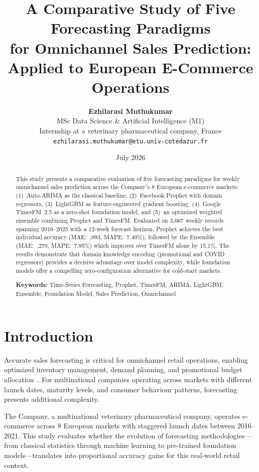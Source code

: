 \documentclass[10pt,twocolumn,a4paper]{article}
\title{\vspace{-1.5cm}\textbf{A Comparative Study of Five Forecasting Paradigms\\for Omnichannel Sales Prediction:\\Applied to European E-Commerce Operations}\vspace{-0.3cm}}
\author{
    \textbf{Ezhilarasi Muthukumar}\\
    \small MSc Data Science \& Artificial Intelligence (M1)\\
    \small Internship at a veterinary pharmaceutical company, France\\
    \small \texttt{ezhilarasi.muthukumar@etu.univ-cotedazur.fr}
}
\date{\small July 2026}
\begin{document}
\maketitle
\thispagestyle{fancy}

\begin{abstract}
\noindent This study presents a comparative evaluation of five forecasting paradigms for weekly omnichannel sales prediction across the Company's 8 European e-commerce markets: (1)~Auto-ARIMA as the classical baseline, (2)~Facebook Prophet with domain regressors, (3)~LightGBM as feature-engineered gradient boosting, (4)~Google TimesFM~2.5 as a zero-shot foundation model, and (5)~an optimized weighted ensemble combining Prophet and TimesFM. Evaluated on 3,067 weekly records spanning 2016--2025 with a 12-week forecast horizon, Prophet achieves the best individual accuracy (MAE:~,093, MAPE:~7.40\%), followed by the Ensemble (MAE:~,270, MAPE:~7.95\%) which improves over TimesFM alone by 15.1\%. The results demonstrate that domain knowledge encoding (promotional and COVID regressors) provides a decisive advantage over model complexity, while foundation models offer a compelling zero-configuration alternative for cold-start markets.

\medskip
\noindent\textbf{Keywords:} Time-Series Forecasting, Prophet, TimesFM, ARIMA, LightGBM, Ensemble, Foundation Model, Sales Prediction, Omnichannel
\end{abstract}

\section{Introduction}
\label{sec:intro}

Accurate sales forecasting is critical for omnichannel retail operations, enabling optimized inventory management, demand planning, and promotional budget allocation~\cite{taylor2018forecasting}. For multinational companies operating across markets with different launch dates, maturity levels, and consumer behaviour patterns, forecasting presents additional complexity.

The Company, a multinational veterinary pharmaceutical company, operates e-commerce across 8 European markets with staggered launch dates between 2016--2021. This study evaluates whether the evolution of forecasting methodologies---from classical statistics through machine learning to pre-trained foundation models---translates into proportional accuracy gains for this real-world retail context.
\end{document}
